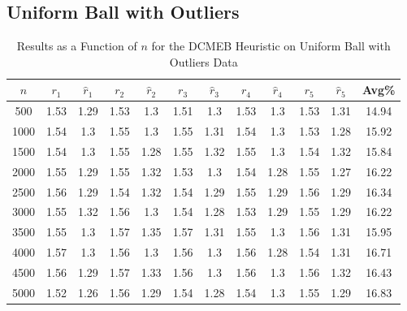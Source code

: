 \documentclass[11pt,twoside]{report}
\theoremstyle{definition}
\numberwithin{theorem}{section}
\numberwithin{definition}{section}
\numberwithin{lemma}{section}
\numberwithin{proposition}{section}
\numberwithin{equation}{section}
\numberwithin{figure}{section}
\begin{document}
\begin{appendices}
    \subsection{Uniform Ball with Outliers}
    \begin{table}[ht]
        \centering
        \begin{tabular}{|c||cc||cc||cc||cc||cc||c|} \hline
            $n$&$r_1$&$\hat{r}_1$&$r_2$&$\hat{r}_2$&$r_3$&$\hat{r}_3$&$r_4$&$\hat{r}_4$&$r_5$&$\hat{r}_5$&Avg\% \\ \hline
            500&1.53&1.29&1.53&1.3&1.51&1.3&1.53&1.3&1.53&1.31&14.94 \\
            1000&1.54&1.3&1.55&1.3&1.55&1.31&1.54&1.3&1.53&1.28&15.92 \\
            1500&1.54&1.3&1.55&1.28&1.55&1.32&1.55&1.3&1.54&1.32&15.84 \\
            2000&1.55&1.29&1.55&1.32&1.53&1.3&1.54&1.28&1.55&1.27&16.22 \\
            2500&1.56&1.29&1.54&1.32&1.54&1.29&1.55&1.29&1.56&1.29&16.34 \\
            3000&1.55&1.32&1.56&1.3&1.54&1.28&1.53&1.29&1.55&1.29&16.22 \\
            3500&1.55&1.3&1.57&1.35&1.57&1.31&1.55&1.3&1.56&1.31&15.95 \\
            4000&1.57&1.3&1.56&1.3&1.56&1.3&1.56&1.28&1.54&1.31&16.71 \\
            4500&1.56&1.29&1.57&1.33&1.56&1.3&1.56&1.3&1.56&1.32&16.43 \\
            5000&1.52&1.26&1.56&1.29&1.54&1.28&1.54&1.3&1.55&1.29&16.83 \\ \hline
        \end{tabular}
        \caption{Results as a Function of $n$ for the DCMEB Heuristic on Uniform Ball with Outliers Data}
        \label{tab:uniform_ball_with_outliers_dcmeb_table_n}
    \end{table}
    

\end{appendices}
\end{document}
